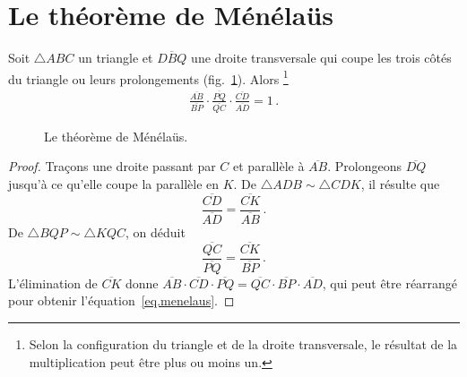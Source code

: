 \section{Le théorème de Ménélaüs}\label{a.menelaus}

\begin{theorem}[Ménélaüs]\label{thm.menelaus} 
Soit $\triangle ABC$ un triangle et $\overline{DBQ}$ une droite transversale qui coupe les trois côtés du triangle ou leurs prolongements (fig.~\ref{f.menelaus}). Alors \footnote{Selon la configuration du triangle et de la droite transversale, le résultat de la multiplication peut être plus ou moins un.}
\begin{align}
\displaystyle\frac{\overline{AB}}{\overline{BP}}\cdot
\displaystyle\frac{\overline{PQ}}{\overline{QC}}\cdot
\displaystyle\frac{\overline{CD}}{\overline{AD}}=1\,.\label{eq.menelaus}
\end{align}
\end{theorem}


\begin{figure}[htbp]
\centering
\caption{Le théorème de Ménélaüs.}\label{f.menelaus}
\end{figure}

\begin{proof}
Traçons une droite passant par $C$ et parallèle à $\overline{AB}$. Prolongeons $\overline{DQ}$ jusqu'à ce qu'elle coupe la parallèle en $K$. De $\triangle ADB \sim \triangle CDK$, il résulte que 
\begin{equation*}
\displaystyle\frac{\overline{CD}}{\overline{AD}}=\displaystyle\frac{\overline{CK}}{\overline{AB}}\,.
\end{equation*}
De $\triangle  BQP\sim \triangle KQC$, on déduit
\begin{equation*}
\displaystyle\frac{\overline{QC}}{\overline{PQ}}=\displaystyle\frac{\overline{CK}}{\overline{BP}}\,.
\end{equation*}
L'élimination de  $\overline{CK}$ donne 
$\overline{AB}\cdot\overline{CD}\cdot\overline{PQ}=\overline{QC}\cdot\overline{BP}\cdot\overline{AD}$,  qui peut être réarrangé pour obtenir l'équation~\ref{eq.menelaus}.
\end{proof}

